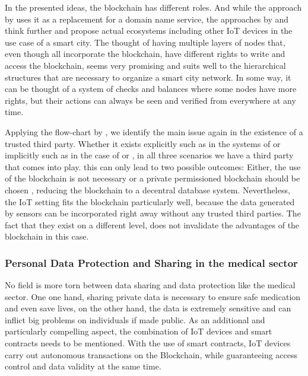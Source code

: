 In the presented ideas, the blockchain has different roles. And while the approach by \cite{Rowan2017} uses it as a replacement for a domain name service, the approaches by \cite{DorriSteger2017} and \cite{Sharma2017} think further and propose actual ecosystems including other IoT devices in the use case of a smart city.
The thought of having multiple layers of nodes that, even though all incorporate the blockchain, have different rights to write and access the blockchain, seems very promising and suits well to the hierarchical structures that are necessary to organize a smart city network. In some way, it can be thought of a system of checks and balances where some nodes have more rights, but their actions can always be seen and verified from everywhere at any time.

Applying the flow-chart by \cite{Wust2017}, we identify the main issue again in the existence of a trusted third party. Whether it exists explicitly such as in the systems of \cite{Sharma2017} or implicitly such as in the case of \cite{Rowan2017} or \cite{DorriSteger2017}, in all three scenarios we have a third party that comes into play. 
\cite{Wust2017} this can only lead to two possible outcomes: Either, the use of the blockchain is not necessary or a private permissioned blockchain should be chosen \cite{Wust2017}, reducing the blockchain to a decentral database system.
Nevertheless, the IoT setting fits the blockchain particularly well, because the data generated by sensors can be incorporated right away without any trusted third parties. The fact that they exist on a different level, does not invalidate the advantages of the blockchain in this case.

\subsubsection{Personal Data Protection and Sharing in the medical sector}
No field is more torn between data sharing and data protection like the medical sector. One one hand, sharing private data is necessary to ensure safe medication and even save lives, on the other hand, the data is extremely sensitive and can inflict big problems on individuals if made public.
As an additional and particularly compelling aspect, the combination of IoT devices and smart contracts needs to be mentioned. With the use of smart contracts, IoT devices carry out autonomous transactions on the Blockchain, while guaranteeing access control and data validity at the same time.

